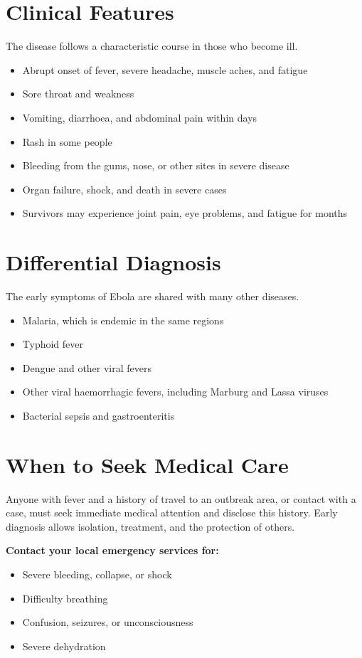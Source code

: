 \section*{Clinical Features}
The disease follows a characteristic course in those who become ill.
\begin{itemize}
    \item Abrupt onset of fever, severe headache, muscle aches, and fatigue
    \item Sore throat and weakness
    \item Vomiting, diarrhoea, and abdominal pain within days
    \item Rash in some people
    \item Bleeding from the gums, nose, or other sites in severe disease
    \item Organ failure, shock, and death in severe cases
    \item Survivors may experience joint pain, eye problems, and fatigue for months
\end{itemize}

\section*{Differential Diagnosis}
The early symptoms of Ebola are shared with many other diseases.
\begin{itemize}
    \item Malaria, which is endemic in the same regions
    \item Typhoid fever
    \item Dengue and other viral fevers
    \item Other viral haemorrhagic fevers, including Marburg and Lassa viruses
    \item Bacterial sepsis and gastroenteritis
\end{itemize}

\section*{When to Seek Medical Care}
Anyone with fever and a history of travel to an outbreak area, or contact with a case, must seek immediate medical attention and disclose this history. Early diagnosis allows isolation, treatment, and the protection of others.

\textbf{Contact your local emergency services for:}
\begin{itemize}
    \item Severe bleeding, collapse, or shock
    \item Difficulty breathing
    \item Confusion, seizures, or unconsciousness
    \item Severe dehydration
\end{itemize}


